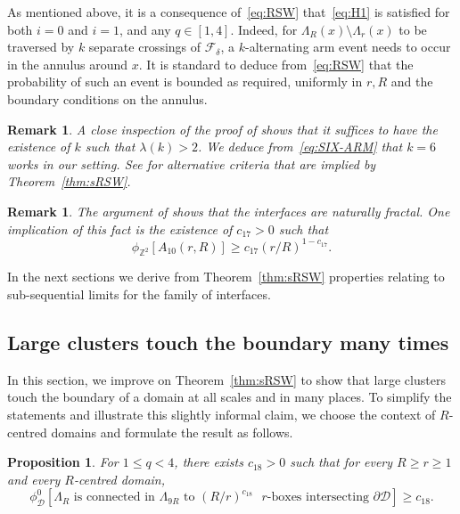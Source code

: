 \documentclass[a4paper,oneside,11pt]{article}
\newtheorem{proposition}[theorem]{Proposition}
\newtheorem{remark}[theorem]{Remark}
\numberwithin{equation}{section}
\numberwithin{equation}{section}
\numberwithin{equation}{section}
\newcommand{\calD}{\mathcal{D}}
\newcommand{\bbZ}{\mathbb{Z}}
\begin{document}
As mentioned above, it is a consequence of~\eqref{eq:RSW} that~\eqref{eq:H1} is satisfied for both $i=0$ and $i = 1$, and any $q \in [1,4]$.
Indeed, for $\Lambda_R(x)\setminus\Lambda_r(x)$ to be traversed by $k$ separate crossings of $\mathcal F_\delta$, 
a $k$-alternating arm event needs to occur in the annulus around $x$. 
It is standard to deduce from~\eqref{eq:RSW} that the probability of such an event is bounded as required, 
uniformly in $r,R$ and the boundary conditions on the annulus.

\begin{remark}
A close inspection of the proof of \cite{AizBur99} shows that it suffices to have the existence of $k$ such that $\lambda(k)>2$. 
We deduce from~\eqref{eq:SIX-ARM} that $k=6$ works in our setting. 
See \cite{KemSmi12} for alternative criteria that are implied by Theorem~\ref{thm:sRSW}.
\end{remark}

\begin{remark}
	The argument of \cite{AizBur99} shows that the interfaces are naturally fractal. 
	One implication of this fact is the existence of $c_{17}>0$ such that 
	\begin{equation}\label{eq:2-arm bound}
		\phi_{\bbZ^2}[A_{10}(r,R)]\ge c_{17}(r/R)^{1-c_{17}}.
	\end{equation}
\end{remark}



In the next sections we derive from Theorem~\ref{thm:sRSW} properties relating to sub-sequential limits for the family of interfaces.


\subsection{Large clusters touch the boundary many times}

In this section, we improve on Theorem~\ref{thm:sRSW} to show that large clusters touch the boundary of a domain at all scales and in many places. 
To simplify the statements and illustrate this slightly informal claim, we choose the context of $R$-centred domains and formulate the result as follows. 

\begin{proposition}\label{prop:polynomially many}
    For $1\le q<4$, there exists $c_{18}>0$ such that for every $R\ge r\ge 1$ and every $R$-centred domain, 
    \begin{equation}\label{eq:polynomially many}
    	\phi_\calD^0[\Lambda_R\text{ is connected in $\Lambda_{9R}$ to $(R/r)^{c_{18}}$ $r$-boxes intersecting }\partial\calD]\ge c_{18}.
    \end{equation}
\end{proposition}
\end{document}
